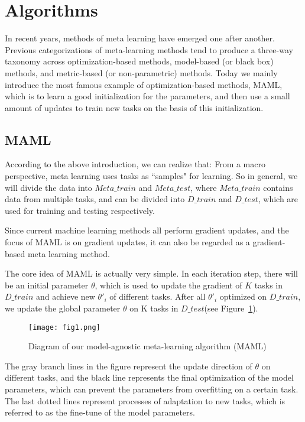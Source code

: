 \section{Algorithms}
\label{sec:algorithms}
In recent years, methods of meta learning have emerged one after another. Previous%
categorizations of meta-learning methods tend to produce a three-way taxonomy across optimization-based methods, model-based (or black box) methods, and metric-based (or non-parametric) methods.
Today we mainly introduce the most famous example of optimization-based methods, MAML, which is to learn a good initialization for the parameters, and then use a small amount of updates to train new tasks on the basis of this initialization.

\subsection{MAML}
According to the above introduction, we can realize that: From a macro perspective, meta learning uses tasks as ``samples" for learning. So in general, we will divide the data into $Meta\_train$ and $Meta\_test$, where $Meta\_train$ contains data from multiple tasks, and can be divided into $D\_train$ and $D\_test$, which are used for training and testing respectively.

Since current machine learning methods all perform gradient updates, and the focus of MAML is on gradient updates, it can also be regarded as a gradient-based meta learning method.

The core idea of MAML is actually very simple. In each iteration step, there will be an initial parameter $\theta$, which is used to update the gradient of $K$ tasks in $D\_train$ and achieve new $\theta'_i$ of different tasks. After all $\theta'_i$ optimized on $D\_train$, we update the global parameter $\theta$ on K tasks in $D\_test$(see Figure~\ref{fig:graph}).

\begin{figure}[h]
  \centering
  \texttt{[image: fig1.png]}
  \caption{Diagram of our model-agnostic meta-learning algorithm (MAML)} \label{fig:graph}
\end{figure}

The gray branch lines in the figure represent the update direction of $\theta$ on different tasks, and the black line represents the final optimization of the model parameters, which can prevent the parameters from overfitting on a certain task. The last dotted lines represent processes of adaptation to new tasks, which is referred to as the fine-tune of the model parameters.

